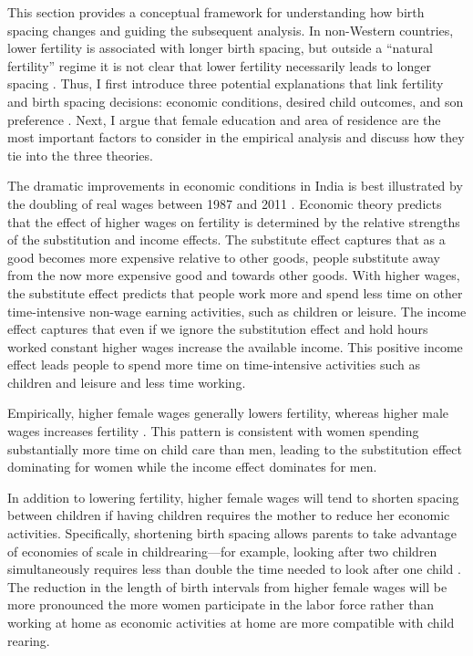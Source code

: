 This section provides a conceptual framework for understanding how birth spacing changes
and guiding the subsequent analysis.
In non-Western countries, lower fertility is associated with longer birth spacing, but 
outside a ``natural fertility'' regime it is not clear that lower fertility necessarily 
leads to longer spacing \citet{Newman1988,Rutstein2011,Casterline2016}.
Thus, I first introduce three potential explanations that link fertility and birth 
spacing decisions: economic conditions, desired child outcomes, and son preference 
\citep{Casterline2016,Portner2018}.
Next, I argue that female education and area of residence are the most important factors 
to consider in the empirical analysis and discuss how they tie into the three theories.


The dramatic improvements in economic conditions in India is best illustrated by the 
doubling of real wages between 1987 and 2011 \citep{Klasen2015}.
Economic theory predicts that the effect of higher wages on fertility is determined by 
the relative strengths of the substitution and income effects.
The substitute effect captures that as a good becomes more expensive relative to other
goods, people substitute away from the now more expensive good and towards other goods.
With higher wages, the substitute effect predicts that people work more and spend less 
time on other time-intensive non-wage earning activities, such as children or leisure.
The income effect captures that even if we ignore the substitution effect and hold hours 
worked constant higher wages increase the available income. 
This positive income effect leads people to spend more time on time-intensive activities 
such as children and leisure and less time working.

Empirically, higher female wages generally lowers fertility, whereas higher male 
wages increases fertility \citet{Hotz1997,schultz97}.
This pattern is consistent with women spending substantially more time on child care 
than men, leading to the substitution effect dominating for women while the income
effect dominates for men.

In addition to lowering fertility, higher female wages will tend to shorten spacing between 
children if having children requires the mother to reduce her economic activities.
Specifically, shortening birth spacing allows parents to take advantage of economies of 
scale in childrearing---for example, looking after two children simultaneously requires 
less than double the time needed to look after one child \citep{Vijverberg1982,Hotz1997}.
The reduction in the length of birth intervals from higher female wages will be more 
pronounced the more women participate in the labor force rather than working at home as 
economic activities at home are more compatible with child rearing.

